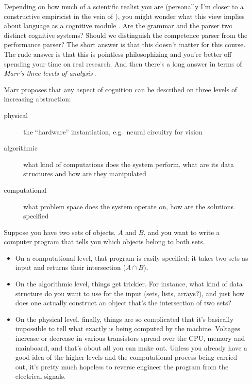 Depending on how much of a scientific realist you are (personally I'm closer to a constructive empiricist in the vein of \citealt{Fraassen80}), you might wonder what this view implies about language as a cognitive module \citep[cf.]{Chomsky86a, Fodor83}.
Are the grammar and the parser two distinct cognitive systems?
Should we distinguish the competence parser from the performance parser?
The short answer is that this doesn't matter for this course.
The rude answer is that this is pointless philosophizing and you're better off spending your time on real research.
And then there's a long answer in terms of \emph{Marr's three levels of analysis} \citep{MarrPoggio76}.

Marr proposes that any aspect of cognition can be described on three levels of increasing abstraction:
%
\begin{description}
    \item[physical] the ``hardware'' instantiation, e.g.\ neural circuitry for vision
    \item[algorithmic] what kind of computations does the system perform, what are its data structures and how are they manipulated
    \item[computational] what problem space does the system operate on, how are the solutions specified
\end{description}
%
\begin{examplebox}
    Suppose you have two sets of objects, $A$ and $B$, and you want to write a computer program that tells you which objects belong to both sets.
    \begin{itemize}
        \item On a computational level, that program is easily specified: it takes two sets as input and returns their intersection ($A \cap B$).
        \item On the algorithmic level, things get trickier.
        For instance, what kind of data structure do you want to use for the input (sets, lists, arrays?), and just how does one actually construct an object that's the intersection of two sets?
    \item On the physical level, finally, things are so complicated that it's basically impossible to tell what exactly is being computed by the machine.
        Voltages increase or decrease in various transistors spread over the CPU, memory and mainboard, and that's about all you can make out.
        Unless you already have a good idea of the higher levels and the computational process being carried out, it's pretty much hopeless to reverse engineer the program from the electrical signals.
    \end{itemize}
\end{examplebox}
